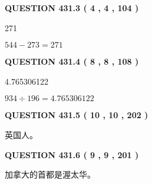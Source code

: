 \documentclass{ctexart}
\begin{document}
 
  
\vspace{0.2in}
  
{\textbf{\Large{QUESTION
431.3 
 ( 4 , 4 , 104 )
}}}
  
  
 
 
\noindent{}

271
 
 
 
 
\noindent{}

$ %
544 -  %
273=   %
271$
 
 
  
\vspace{0.2in}
  
{\textbf{\Large{QUESTION
431.4 
 ( 8 , 8 , 108 )
}}}
  
  
 
 
\noindent{}

4.765306122
 
 
 
 
\noindent{}

$ %
934 \div  %
196=   %
4.765306122$
 
 
  
\vspace{0.2in}
  
{\textbf{\Large{QUESTION
431.5 
 ( 10 , 10 , 202 )
}}}
  
  
 
 
\noindent{}
 
 
英国人。
 
 
 
 
  
\vspace{0.2in}
  
{\textbf{\Large{QUESTION
431.6 
 ( 9 , 9 , 201 )
}}}
  
  
 
 
\noindent{}
 
 
加拿大的首都是渥太华。
 
 
 
 
  
\end{document}
